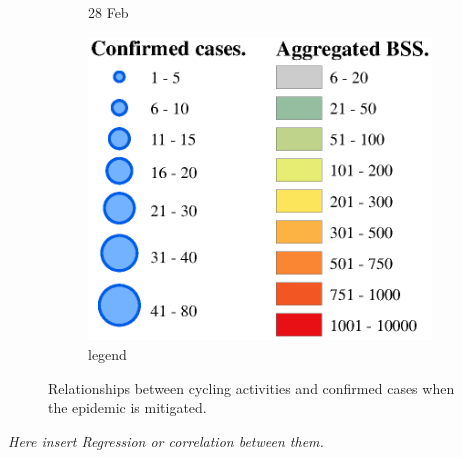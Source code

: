 \documentclass[preprints,ijgi,submit,moreauthors]{Definitions/mdpi}
\begin{document}
\begin{figure}[H]
\begin{subfigure}{.3\textwidth}
        \caption{28 Feb}
    \end{subfigure}
    \begin{subfigure}{.3\textwidth}
        \includegraphics[width=\textwidth]{Figures/Relation_with_confrimed_cases/legend7.eps}
        \caption{legend}
    \end{subfigure}
    \caption{Relationships between cycling activities and confirmed cases when the epidemic is mitigated.}
    \label{fig:BSS_phase_3}
\end{figure}

\textit{Here insert Regression or correlation between them.}
\end{document}

